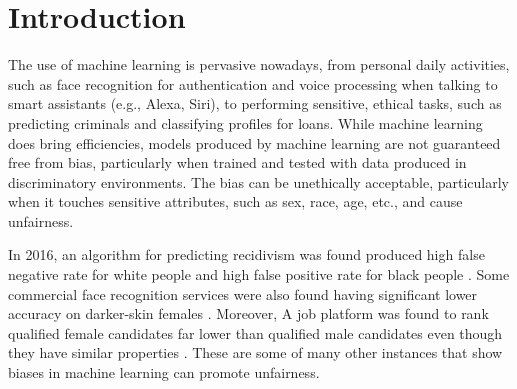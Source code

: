 \documentclass[sigconf,review]{acmart}
\begin{document}


\maketitle

\section{Introduction}
\label{sec:introduction}
The use of machine learning is pervasive nowadays, from personal daily activities, such as face recognition for authentication and voice processing when talking to smart assistants (e.g., Alexa, Siri), to performing sensitive, ethical tasks, such as predicting criminals and classifying profiles for loans. While machine learning does bring efficiencies, models produced by machine learning are not guaranteed free from bias, particularly when trained and tested with data produced in discriminatory environments. The bias can be unethically acceptable, particularly when it touches sensitive attributes, such as sex, race, age, etc., and cause unfairness. 

In 2016, an algorithm for predicting recidivism was found produced high false negative rate for white people and high false positive rate for black people \cite{angwin2016machine}. Some commercial face recognition services were also found having significant lower accuracy on darker-skin females \cite{buolamwini2018gender}. Moreover, A job platform was found to rank qualified female candidates far lower than qualified male candidates even though they have similar properties \cite{lahoti2019ifair}. These are some of many other instances that show biases in machine learning can promote unfairness. 
\end{document}
